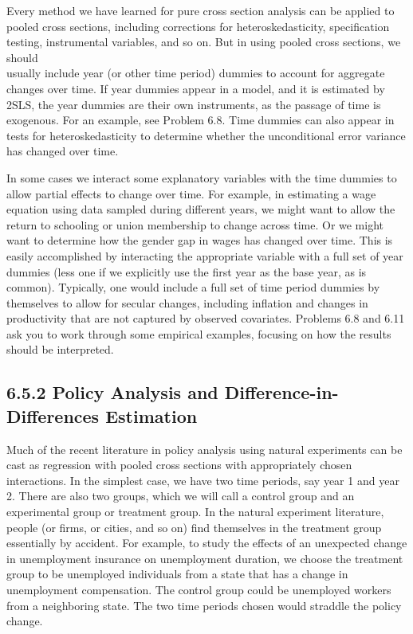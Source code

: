 \documentclass[10pt]{article}
\begin{document}
Every method we have learned for pure cross section analysis can be applied to pooled cross sections, including corrections for heteroskedasticity, specification testing, instrumental variables, and so on. But in using pooled cross sections, we should\\
usually include year (or other time period) dummies to account for aggregate changes over time. If year dummies appear in a model, and it is estimated by 2SLS, the year dummies are their own instruments, as the passage of time is exogenous. For an example, see Problem 6.8. Time dummies can also appear in tests for heteroskedasticity to determine whether the unconditional error variance has changed over time.

In some cases we interact some explanatory variables with the time dummies to allow partial effects to change over time. For example, in estimating a wage equation using data sampled during different years, we might want to allow the return to schooling or union membership to change across time. Or we might want to determine how the gender gap in wages has changed over time. This is easily accomplished by interacting the appropriate variable with a full set of year dummies (less one if we explicitly use the first year as the base year, as is common). Typically, one would include a full set of time period dummies by themselves to allow for secular changes, including inflation and changes in productivity that are not captured by observed covariates. Problems 6.8 and 6.11 ask you to work through some empirical examples, focusing on how the results should be interpreted.

\subsection*{6.5.2 Policy Analysis and Difference-in-Differences Estimation}
Much of the recent literature in policy analysis using natural experiments can be cast as regression with pooled cross sections with appropriately chosen interactions. In the simplest case, we have two time periods, say year 1 and year 2. There are also two groups, which we will call a control group and an experimental group or treatment group. In the natural experiment literature, people (or firms, or cities, and so on) find themselves in the treatment group essentially by accident. For example, to study the effects of an unexpected change in unemployment insurance on unemployment duration, we choose the treatment group to be unemployed individuals from a state that has a change in unemployment compensation. The control group could be unemployed workers from a neighboring state. The two time periods chosen would straddle the policy change.
\end{document}
